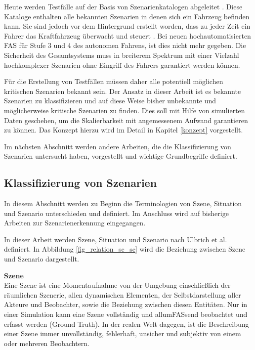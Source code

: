Heute werden Testfälle auf der Basis von Szenarienkatalogen abgeleitet \cite{putz2017system}. Diese Kataloge enthalten alle bekannten Szenarien in denen sich ein Fahrzeug befinden kann. Sie sind jedoch vor dem Hintergrund erstellt worden, dass zu jeder Zeit ein Fahrer das Kraftfahrzeug überwacht und steuert \cite{wachenfeld2015freigabe}. Bei neuen hochautomatisierten \ac{FAS} für Stufe 3 und 4 des autonomen Fahrens, ist dies nicht mehr gegeben. Die Sicherheit des Gesamtsystems muss in breiterem Spektrum mit einer Vielzahl hochkomplexer Szenarien ohne Eingriff des Fahrers garantiert werden können.

Für die Erstellung von Testfällen müssen daher alle potentiell möglichen kritischen Szenarien bekannt sein. Der Ansatz in dieser Arbeit ist es bekannte Szenarien zu klassifizieren und auf diese Weise bisher unbekannte und möglicherweise kritische Szenarien zu finden. Dies soll mit Hilfe von simulierten Daten geschehen, um die Skalierbarkeit mit angemessenem Aufwand garantieren zu können. Das Konzept hierzu wird im Detail in Kapitel \ref{konzept} vorgestellt.

 Im nächsten Abschnitt werden andere Arbeiten, die die Klassifizierung von Szenarien untersucht haben, vorgestellt und wichtige Grundbegriffe definiert.


\subsection{Klassifizierung von Szenarien}
\label{grundlagen_fahren_szenarien}

In diesem Abschnitt werden zu Beginn die Terminologien von Szene, Situation und Szenario unterschieden und definiert. Im Anschluss wird auf bisherige Arbeiten zur Szenarienerkennung eingegangen.

In dieser Arbeit werden Szene, Situation und Szenario nach Ulbrich et al. \cite{ulbrich2015defining} definiert. In Abbildung \ref{fig_relation_sc_sc} wird die Beziehung zwischen Szene und Szenario dargestellt.

\noindent\textbf{Szene}\\
Eine Szene ist eine Momentaufnahme von der Umgebung einschließlich der räumlichen Szenerie,  allen dynamischen Elementen, der Selbstdarstellung aller Akteure und Beobachter, sowie die Beziehung zwischen diesen Entitäten. Nur in einer Simulation kann eine Szene vollständig und allumFASsend beobachtet und erfasst werden (Ground Truth). In der realen Welt dagegen, ist die Beschreibung einer Szene immer unvollständig, fehlerhaft, unsicher und subjektiv von einem oder mehreren Beobachtern.

